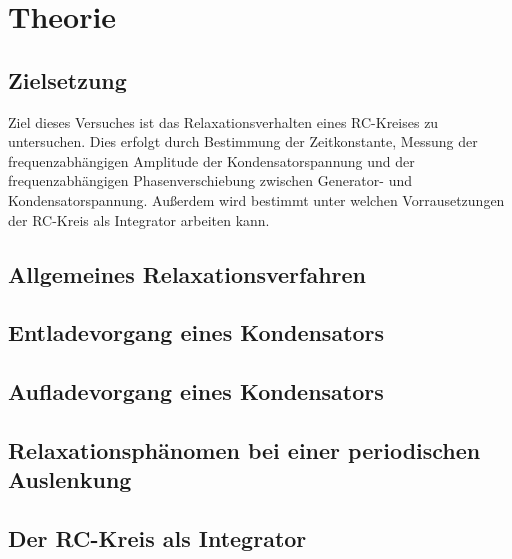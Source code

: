 \section{Theorie}
\label{sec:Theorie}

\subsection{Zielsetzung}
\label{sub:Zielsetzung}

Ziel dieses Versuches ist das Relaxationsverhalten eines RC-Kreises zu untersuchen. 
Dies erfolgt durch Bestimmung der Zeitkonstante, Messung der frequenzabhängigen Amplitude der Kondensatorspannung und 
der frequenzabhängigen Phasenverschiebung zwischen Generator- und Kondensatorspannung.
Außerdem wird bestimmt unter welchen Vorrausetzungen der RC-Kreis als Integrator arbeiten kann.

\subsection{Allgemeines Relaxationsverfahren} %
\label{sub:Allgemein}


\subsection{Entladevorgang eines Kondensators} %
\label{sub:Entladevorgang}




\subsection{Aufladevorgang eines Kondensators} %
\label{sub:Aufladevorgang}



\subsection{Relaxationsphänomen bei einer periodischen Auslenkung} %
\label{sub:Rela_peri}


\subsection{Der RC-Kreis als Integrator} %
\label{sub:Integrator}

